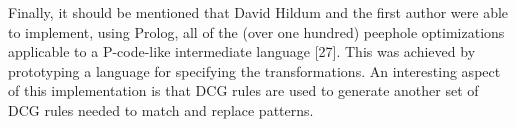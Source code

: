 Finally, it should be mentioned that David Hildum and the first author were
able to implement, using Prolog, all of the (over one hundred) peephole optimizations
applicable to a P-code-like intermediate language [27]. This was achieved
by prototyping a language for specifying the transformations. An interesting
aspect of this implementation is that DCG rules are used to generate another set
of DCG rules needed to match and replace patterns. 
